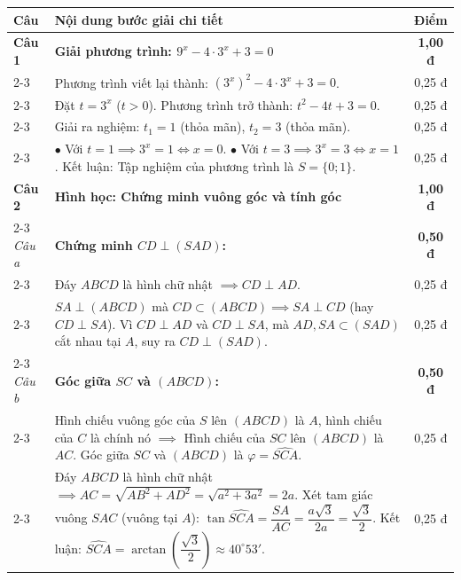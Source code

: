 \documentclass[12pt, a4paper]{article}
\begin{document}
\begin{center}
\begin{tabularx}{\textwidth}{|p{1.5cm}|X|c|}
\hline
\textbf{Câu} & \textbf{Nội dung bước giải chi tiết} & \textbf{Điểm} \\ \hline
\textbf{Câu 1} & \textbf{Giải phương trình: $9^x - 4 \cdot 3^x + 3 = 0$} & \textbf{1,00 đ} \\ \cline{2-3}
 & Phương trình viết lại thành: $(3^x)^2 - 4 \cdot 3^x + 3 = 0$. & 0,25 đ \\ \cline{2-3}
 & Đặt $t = 3^x$ ($t > 0$). Phương trình trở thành: $t^2 - 4t + 3 = 0$. & 0,25 đ \\ \cline{2-3}
 & Giải ra nghiệm: $t_1 = 1$ (thỏa mãn), $t_2 = 3$ (thỏa mãn). & 0,25 đ \\ \cline{2-3}
 & $\bullet$ Với $t = 1 \implies 3^x = 1 \iff x = 0$.\newline
 $\bullet$ Với $t = 3 \implies 3^x = 3 \iff x = 1$.\newline
 Kết luận: Tập nghiệm của phương trình là $S = \{0; 1\}$. & 0,25 đ \\ \hline
\textbf{Câu 2} & \textbf{Hình học: Chứng minh vuông góc và tính góc} & \textbf{1,00 đ} \\ \cline{2-3}
\textit{Câu a} & \textbf{Chứng minh $CD \perp (SAD)$:} & \textbf{0,50 đ} \\ \cline{2-3}
 & Đáy $ABCD$ là hình chữ nhật $\implies CD \perp AD$. & 0,25 đ \\ \cline{2-3}
 & $SA \perp (ABCD)$ mà $CD \subset (ABCD) \implies SA \perp CD$ (hay $CD \perp SA$).\newline
 Vì $CD \perp AD$ và $CD \perp SA$, mà $AD, SA \subset (SAD)$ cắt nhau tại $A$, suy ra $CD \perp (SAD)$. & 0,25 đ \\ \cline{2-3}
\textit{Câu b} & \textbf{Góc giữa $SC$ và $(ABCD)$:} & \textbf{0,50 đ} \\ \cline{2-3}
 & Hình chiếu vuông góc của $S$ lên $(ABCD)$ là $A$, hình chiếu của $C$ là chính nó $\implies$ Hình chiếu của $SC$ lên $(ABCD)$ là $AC$.\newline
 Góc giữa $SC$ và $(ABCD)$ là $\varphi = \widehat{SCA}$. & 0,25 đ \\ \cline{2-3}
 & Đáy $ABCD$ là hình chữ nhật $\implies AC = \sqrt{AB^2 + AD^2} = \sqrt{a^2 + 3a^2} = 2a$.\newline
 Xét tam giác vuông $SAC$ (vuông tại $A$): $\tan \widehat{SCA} = \dfrac{SA}{AC} = \dfrac{a\sqrt{3}}{2a} = \dfrac{\sqrt{3}}{2}$.\newline
 Kết luận: $\widehat{SCA} = \arctan \left(\dfrac{\sqrt{3}}{2}\right) \approx 40^\circ 53'$. & 0,25 đ \\ \hline

\end{tabularx}
\end{center}
\end{document}
